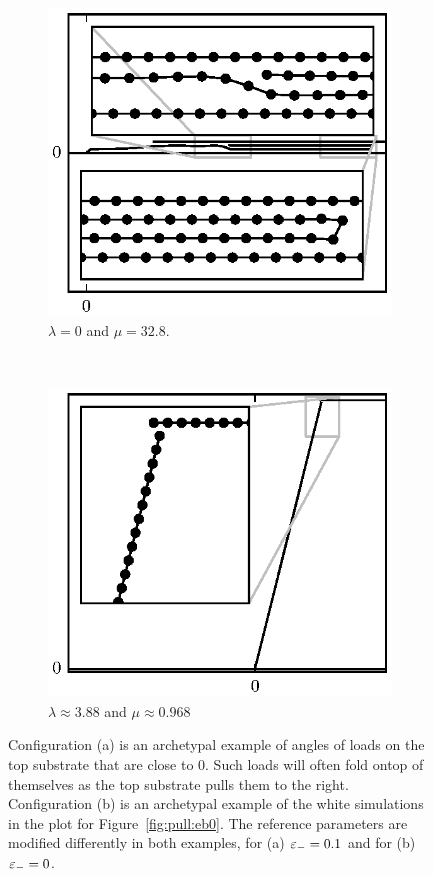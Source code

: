 	\begin{figure}[t]
		\centering
		\begin{subfigure}{.5\textwidth}
			\centering
			\includegraphics{./fig/ch3/pull/eb0.1/l0_m32.8.eps}
			\caption{$\lambda=0$ and $\mu=32.8$. \label{subfig:folded_over}}
		\end{subfigure}%
		~
		\begin{subfigure}{.5\textwidth}
			\centering
			\includegraphics{./fig/ch3/pull/eb0/t76_m4.eps}
			\caption{$\lambda\approx3.88$ and $\mu\approx0.968$\label{subfig:barely_adhered}}
		\end{subfigure}
		\caption{Configuration (a) is an archetypal example of angles of loads on the top substrate that are close to 0. Such loads will often fold ontop of themselves as the top substrate pulls them to the right. Configuration (b) is an archetypal example of the white simulations in the plot for Figure~\ref{fig:pull:eb0}. The reference parameters are modified differently in both examples, for (a) $\varepsilon_-=0.1$ and for (b) $\varepsilon_-=0$.\label{fig:pull_equil}}	
	\end{figure}

